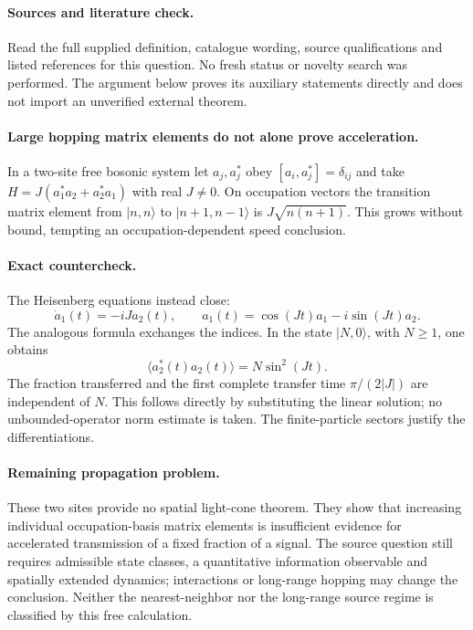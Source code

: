 \documentclass[11pt]{article}
\begin{document}
\paragraph{Sources and literature check.}
Read the full supplied definition, catalogue wording, source qualifications and listed references for this question. No fresh status or novelty search was performed. The argument below proves its auxiliary statements directly and does not import an unverified external theorem.

\paragraph{Large hopping matrix elements do not alone prove acceleration.} In a two-site free bosonic system let \(a_j,a_j^*\) obey \([a_i,a_j^*]=\delta_{ij}\) and take \(H=J(a_1^*a_2+a_2^*a_1)\) with real \(J\ne0\). On occupation vectors the transition matrix element from \(|n,n\rangle\) to \(|n+1,n-1\rangle\) is \(J\sqrt{n(n+1)}\). This grows without bound, tempting an occupation-dependent speed conclusion.
\paragraph{Exact countercheck.} The Heisenberg equations instead close:
\[
 \dot a_1(t)=-iJ a_2(t),\qquad
 a_1(t)=\cos(Jt)a_1-i\sin(Jt)a_2.
\]
The analogous formula exchanges the indices. In the state \(|N,0\rangle\), with \(N\geq1\), one obtains
\[
 \langle a_2^*(t)a_2(t)\rangle=N\sin^2(Jt).
\]
The fraction transferred and the first complete transfer time \(\pi/(2|J|)\) are independent of \(N\). This follows directly by substituting the linear solution; no unbounded-operator norm estimate is taken. The finite-particle sectors justify the differentiations.
\paragraph{Remaining propagation problem.} These two sites provide no spatial light-cone theorem. They show that increasing individual occupation-basis matrix elements is insufficient evidence for accelerated transmission of a fixed fraction of a signal. The source question still requires admissible state classes, a quantitative information observable and spatially extended dynamics; interactions or long-range hopping may change the conclusion. Neither the nearest-neighbor nor the long-range source regime is classified by this free calculation.
\end{document}
